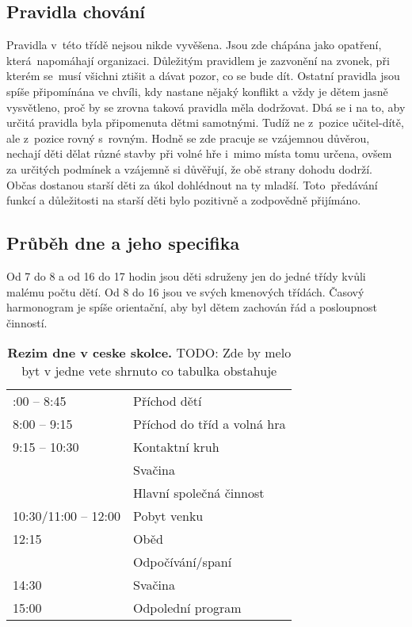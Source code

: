 		\subsection{Pravidla chování}
			Pravidla v této třídě nejsou nikde vyvěšena. Jsou zde chápána jako opatření, která napomáhají organizaci. Důležitým pravidlem je zazvonění na zvonek, při kterém se musí všichni ztišit a dávat pozor, co se bude dít. Ostatní pravidla jsou spíše připomínána ve chvíli, kdy nastane nějaký konflikt a vždy je dětem jasně vysvětleno, proč by se zrovna taková pravidla měla dodržovat. Dbá se i na to, aby určitá pravidla byla připomenuta dětmi samotnými. Tudíž ne z pozice učitel-dítě, ale z pozice rovný s rovným.
			Hodně se zde pracuje se vzájemnou důvěrou, nechají děti dělat různé stavby při volné hře i mimo místa tomu určena, ovšem za určitých podmínek a vzájemně si důvěřují, že obě strany dohodu dodrží. Občas dostanou starší děti za úkol dohlédnout na ty mladší. Toto předávání funkcí a důležitosti na starší děti bylo pozitivně  a zodpovědně přijímáno.

		\subsection{Průběh dne a jeho specifika}

			Od 7 do 8 a od 16 do 17 hodin jsou děti sdruženy jen do jedné třídy kvůli malému počtu dětí. Od 8 do 16 jsou ve svých kmenových třídách.
			Časový harmonogram je spíše orientační, aby byl dětem zachován řád a posloupnost činností. 

	\begin{spacing}{1.0}
	\begin{table}
		\center
		\begin{tabular}{|l l|}
			\rowcolor{white}
			\hline
			7:00 – 8:45				& Příchod dětí 				 	\\
			8:00 – 9:15				& Příchod do tříd a volná hra 	\\
			9:15 – 10:30			& Kontaktní kruh 				\\
									& Svačina 						\\
									& Hlavní společná činnost 		\\
			10:30/11:00 – 12:00		& Pobyt venku 					\\
			12:15					& Oběd 							\\
									& Odpočívání/spaní 				\\
			14:30					& Svačina 						\\
			15:00					& Odpolední program 			\\
			\hline
		\end{tabular}
		\caption{ \textbf{Rezim dne v ceske skolce.}
			TODO: Zde by melo byt v jedne vete shrnuto co tabulka obstahuje
		}
		\label{tab:rezimDneCR}
	\end{table}
	\end{spacing}

